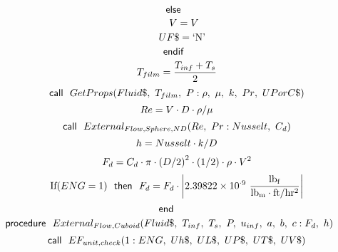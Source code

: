 \documentclass[10pt,fleqn]{article}
\newcommand{\F}[1]{\mbox{$#1$}}
\newcommand{\K}[1]{\mbox{\sf#1\ \ \mit}}
\newcommand{\KS}[1]{\mbox{\sf\ \ #1\ \ \mit}}
\newcommand{\SC}[1]{\mbox{`#1'}\  }
\newcommand{\V}[1]{\mbox{$ #1 $}}
\newcommand{\I}{\mbox{\hspace{0.20in}}}
\begin{document}
\begin{equation}
\I \label{EES Eqn:103}
\K{else} 
\end{equation}
\begin{equation}
\I \I \label{EES Eqn:104}
V=V 
\end{equation}
\begin{equation}
\I \I \label{EES Eqn:105}
UF\$=\SC{N} 
\end{equation}
\begin{equation}
\I \label{EES Eqn:106}
\K{endif} 
\end{equation}
\begin{equation}
\I \label{EES Eqn:107}
T_{film}=\frac {T_{inf}+T_{s}}{ 2 } 
\end{equation}
\begin{equation}
\I \label{EES Eqn:108}
\K{call} \F{GetProps}{ \left( Fluid\$,\ T_{film},\ P: \rho,\ \mu,\ k,\ \V{Pr} ,\ UPorC\$ \right) } 
\end{equation}
\begin{equation}
\I \label{EES Eqn:109}
\V{Re} =V\cdot D\cdot \rho/\mu 
\end{equation}
\begin{equation}
\I \label{EES Eqn:110}
\K{call} \F{External_{Flow,Sphere,ND}}{ \left( \V{Re} ,\ \V{Pr} :\V{Nusselt} ,\ C_{d} \right) } 
\end{equation}
\begin{equation}
\I \label{EES Eqn:111}
h=\V{Nusselt} \cdot k/D 
\end{equation}
\begin{equation}
\I \label{EES Eqn:112}
F_{d}=C_{d}\cdot \pi\cdot  \left( D/2 \right) ^{2}\cdot  \left( 1/2 \right) \cdot \rho\cdot V^{2} 
\end{equation}
\begin{equation}
\I \label{EES Eqn:113}
\mbox{If}{ \left( \V{ENG} =1 \right) } \KS{then}  F_{d}=F_{d}\cdot \rm { \left|2.39822\times 10^{ \cdot 9}\ \frac {\rm{lb_{f}}}{\rm{lb_{m} \cdot ft/hr^{2}}}\right|} 
\end{equation}
\begin{equation}
\label{EES Eqn:114}
\K{end} 
\end{equation}
\vspace{0.1 in}
\begin{equation}
\label{EES Eqn:115}
\K{procedure} \F{External_{Flow,Cuboid}}{ \left( Fluid\$,\ T_{inf},\ T_{s},\ P,\ u_{inf},\ a,\ b,\ c:F_{d},\ h \right) } 
\end{equation}
\begin{equation}
\I \label{EES Eqn:116}
\K{call} \F{EF_{unit,check}}{ \left( 1:\V{ENG} ,\ Uh\$,\ UL\$,\ UP\$,\ UT\$,\ UV\$ \right) } 
\end{equation}
\end{document}
